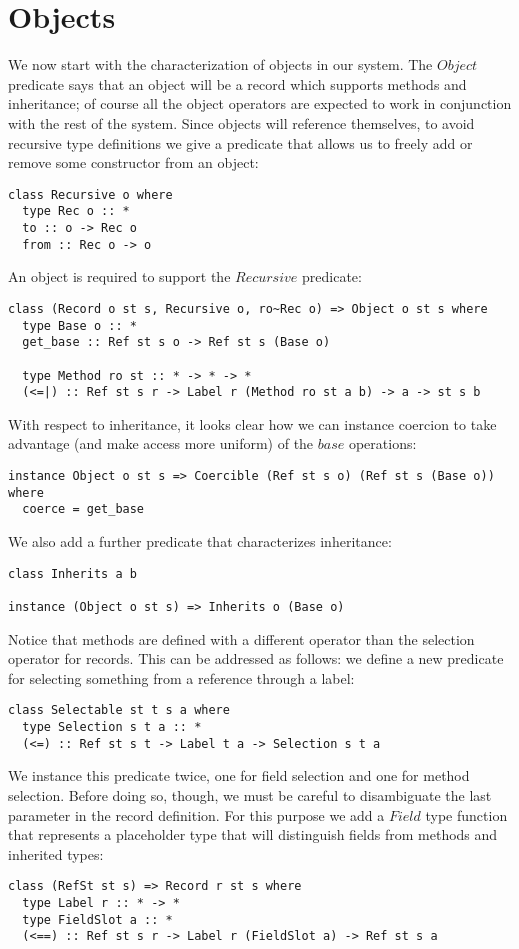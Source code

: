 \section{Objects}
We now start with the characterization of objects in our system. The $Object$ predicate says that an object will be a record which supports methods and inheritance; of course all the object operators are expected to work in conjunction with the rest of the system. Since objects will reference themselves, to avoid recursive type definitions we give a predicate that allows us to freely add or remove some constructor from an object:
\begin{lstlisting}
class Recursive o where
  type Rec o :: *
  to :: o -> Rec o
  from :: Rec o -> o
\end{lstlisting}

An object is required to support the $Recursive$ predicate:
\begin{lstlisting}
class (Record o st s, Recursive o, ro~Rec o) => Object o st s where
  type Base o :: *
  get_base :: Ref st s o -> Ref st s (Base o)

  type Method ro st :: * -> * -> *
  (<=|) :: Ref st s r -> Label r (Method ro st a b) -> a -> st s b
\end{lstlisting}

With respect to inheritance, it looks clear how we can instance coercion to take advantage (and make access more uniform) of the $base$ operations:
\begin{lstlisting}
instance Object o st s => Coercible (Ref st s o) (Ref st s (Base o)) where
  coerce = get_base
\end{lstlisting}

We also add a further predicate that characterizes inheritance:
\begin{lstlisting}
class Inherits a b

instance (Object o st s) => Inherits o (Base o)
\end{lstlisting}

Notice that methods are defined with a different operator than the selection operator for records. This can be addressed as follows: we define a new predicate for selecting something from a reference through a label:
\begin{lstlisting}
class Selectable st t s a where
  type Selection s t a :: *
  (<=) :: Ref st s t -> Label t a -> Selection s t a
\end{lstlisting}

We instance this predicate twice, one for field selection and one for method selection. Before doing so, though, we must be careful to disambiguate the last parameter in the record definition. For this purpose we add a $Field$ type function that represents a placeholder type that will distinguish fields from methods and inherited types:
\begin{lstlisting}
class (RefSt st s) => Record r st s where
  type Label r :: * -> *
  type FieldSlot a :: *
  (<==) :: Ref st s r -> Label r (FieldSlot a) -> Ref st s a
\end{lstlisting}

